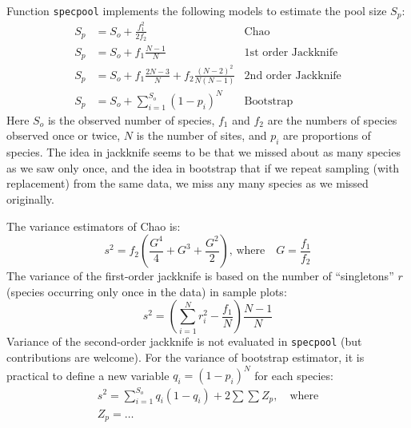 \documentclass[a4paper,10pt]{amsart}
\begin{document}
Function \texttt{specpool} implements the following models to estimate
the pool size $S_p$:
\begin{align}
S_p &= S_o + \frac{f_1^2}{2 f_2} & \text{Chao}\\
S_p &= S_o + f_1 \frac{N-1}{N} & \text{1st order Jackknife}\\
S_p & = S_o + f_1 \frac{2N-3}{N} + f_2 \frac{(N-2)^2}{N(N-1)} &
\text{2nd order Jackknife}\\
S_p &= S_o + \sum_{i=1}^{S_o} (1-p_i)^N & \text{Bootstrap}
\end{align}
Here $S_o$ is the observed number of species, $f_1$ and $f_2$ are the
numbers of species observed once or twice, $N$ is the number of sites,
and $p_i$ are proportions of species.  The idea in jackknife seems to
be that we missed about as many species as we saw only once, and the
idea in bootstrap that if we repeat sampling (with replacement) from
the same data, we miss any many species as we missed originally.

The variance estimators of Chao is:
\begin{equation}
s^2 = f_2 \left(\frac{G^4}{4} + G^3 + \frac{G^2}{2} \right), \,
\text{where}\quad G = \frac{f_1}{f_2}
\end{equation}
The variance of the first-order jackknife is based on the number of
``singletons'' $r$ (species occurring only once in the data) in sample
plots:
\begin{equation}
s^2 = \left(\sum_{i=1}^N r_i^2 - \frac{f_1}{N}\right) \frac{N-1}{N}
\end{equation}
Variance of the second-order jackknife is not evaluated in
\texttt{specpool} (but contributions are welcome).
For the variance of bootstrap estimator, it is practical to define a
new variable $q_i = (1-p_i)^N$ for each species:
\begin{equation}
\begin{split}
s^2 = \sum_{i=1}^{S_o} q_i (1-q_i) + 2 \sum \sum Z_p , \quad \text{where} \\
Z_p = \dots
\end{split}
\end{equation}
\end{document}
